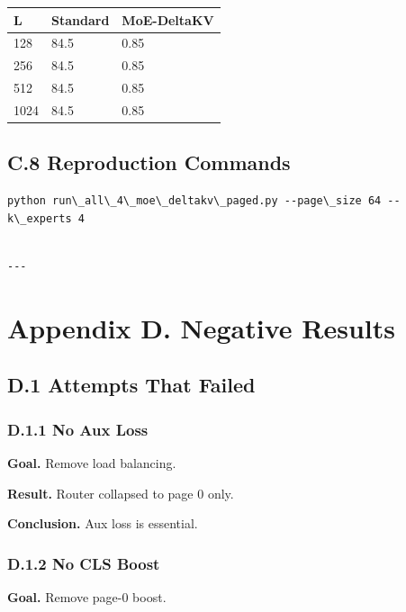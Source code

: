 \begin{table}[H]
\centering
\small
\begin{tabular}{lll}
\toprule
\textbf{L} & \textbf{Standard} & \textbf{MoE-DeltaKV} \\
\midrule
128 & 84.5 & 0.85 \\
256 & 84.5 & 0.85 \\
512 & 84.5 & 0.85 \\
1024 & 84.5 & 0.85 \\
\bottomrule
\end{tabular}
\end{table}

\subsection{C.8 Reproduction Commands}

\begin{lstlisting}
python run\_all\_4\_moe\_deltakv\_paged.py --page\_size 64 --k\_experts 4
\end{lstlisting}
\begin{lstlisting}

---
\end{lstlisting}

\section{Appendix D. Negative Results}

\subsection{D.1 Attempts That Failed}

\subsubsection{D.1.1 No Aux Loss}

\textbf{Goal.} Remove load balancing.

\textbf{Result.} Router collapsed to page 0 only.

\textbf{Conclusion.} Aux loss is essential.

\subsubsection{D.1.2 No CLS Boost}

\textbf{Goal.} Remove page-0 boost.


